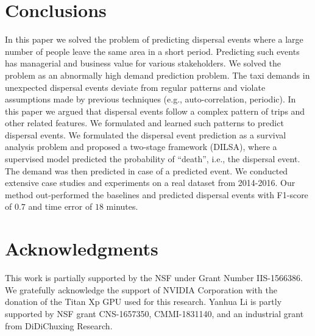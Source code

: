 \documentclass[letterpaper]{article} %
\begin{document}
\section{Conclusions}
\label{conclusion}
In this paper we solved the problem of predicting dispersal events where a large number of people leave the same area in a short period. Predicting such events has managerial and business value for various stakeholders. We solved the problem as an abnormally high demand prediction problem. The taxi demands in unexpected dispersal events deviate from regular patterns and violate assumptions made by previous techniques (e.g., auto-correlation, periodic). In this paper we argued that dispersal events follow a complex pattern of trips and other related features. We formulated and learned such patterns to predict dispersal events. We formulated the dispersal event prediction as a survival analysis problem and proposed a two-stage framework (DILSA), where a supervised model predicted the probability of ``death'', i.e., the dispersal event. The demand was then predicted in case of a predicted event. We conducted extensive case studies and experiments on a real dataset from 2014-2016. Our method out-performed the baselines and predicted dispersal events with F1-score of $0.7$ and time error of $18$ minutes.

\section{Acknowledgments}
This work is partially supported by the NSF under Grant Number IIS-1566386. We gratefully acknowledge the support of NVIDIA Corporation with the donation of the Titan Xp GPU used for this research. Yanhua Li is partly supported by NSF grant CNS-1657350, CMMI-1831140, and an industrial grant from DiDiChuxing Research.



\end{document}

